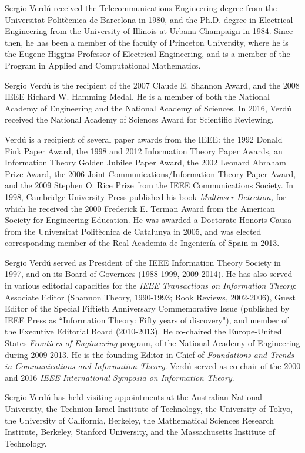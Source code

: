 \documentclass[journal, 10pt]{IEEEtran}
\theoremstyle{plain}
\theoremstyle{plain}
\theoremstyle{plain}
\theoremstyle{plain}
\begin{document}
\begin{IEEEbiographynophoto}{Sergio Verd\'u}
received the Telecommunications Engineering degree from the
Universitat Polit\`{e}cnica de Barcelona in 1980, and the Ph.D. degree in Electrical Engineering from the
University of Illinois at Urbana-Champaign in 1984. Since then, he has been a member of the faculty of
Princeton University, where he is the Eugene Higgins Professor of Electrical Engineering, and is a member
of the Program in Applied and Computational Mathematics.

Sergio Verd\'{u} is  the recipient of 
the 2007 Claude E. Shannon Award, and
the 2008 IEEE Richard W. Hamming Medal. 
He is a member of both the National Academy of Engineering and the National Academy of Sciences. 
In 2016, Verd\'{u} received the National Academy of Sciences Award for Scientific Reviewing.

Verd\'{u} is a recipient of several paper awards from the IEEE: 
the 1992 Donald Fink Paper Award, 
the 1998 and 2012 Information Theory  Paper Awards, 
an Information Theory Golden Jubilee Paper Award,
the 2002 Leonard Abraham Prize Award,  
the 2006 Joint Communications/Information Theory Paper Award, 
and the 2009 Stephen O. Rice Prize from the IEEE Communications Society.  
In 1998, Cambridge University Press published his book {\em Multiuser Detection,} 
for which he received the 2000 Frederick E. Terman Award from the American Society for Engineering Education. 
He was awarded a Doctorate Honoris Causa from the Universitat  Polit\`{e}cnica de Catalunya in 2005, and was elected corresponding member of the Real Academia de Ingenier\'{i}a of Spain in 2013.

Sergio Verd\'{u} served as President of the IEEE Information Theory Society in 1997, and
on its Board of Governors (1988-1999, 2009-2014).
He has also served in various editorial capacities for the {\em IEEE Transactions on Information Theory}:
Associate Editor (Shannon Theory, 1990-1993; Book Reviews, 2002-2006),  
Guest Editor of the Special Fiftieth Anniversary Commemorative Issue
(published by IEEE Press as ``Information Theory: Fifty years of discovery"), 
and member of the Executive Editorial Board (2010-2013).
He co-chaired the  Europe-United States {\em Frontiers of Engineering} program, of
the National Academy of Engineering during 2009-2013.
He is the founding Editor-in-Chief of {\em Foundations and Trends in Communications and Information Theory}. 
Verd\'{u} served as co-chair of the 2000 and 2016 {\em IEEE International Symposia on Information Theory}.

Sergio Verd\'{u} has held visiting appointments at 
the Australian National University, 
the Technion-Israel Institute of Technology, 
the University of Tokyo, 
the University of California, Berkeley, 
the Mathematical Sciences Research Institute, Berkeley, 
Stanford University, 
and the Massachusetts Institute of Technology.
\end{IEEEbiographynophoto}
\end{document}
